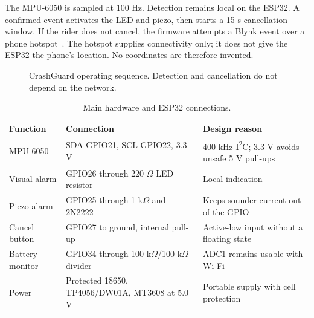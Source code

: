 \documentclass[12pt,a4paper]{article}
\begin{document}
The MPU-6050 is sampled at 100 Hz. Detection remains local on the ESP32. A
confirmed event activates the LED and piezo, then starts a 15 s cancellation
window. If the rider does not cancel, the firmware attempts a Blynk event over
a phone hotspot~\cite{blynkevents}. The hotspot supplies connectivity only;
it does not give the ESP32 the phone's location. No coordinates are therefore
invented.

\begin{figure}[H]
\centering
{}
\caption{CrashGuard operating sequence. Detection and cancellation do not
depend on the network.}
\label{fig:architecture}
\end{figure}

\begin{table}[H]
\centering
\small
\caption{Main hardware and ESP32 connections.}
\begin{tabularx}{\textwidth}{@{}p{}p{}X@{}}
\toprule
Function & Connection & Design reason \\
\midrule
MPU-6050 & SDA GPIO21, SCL GPIO22, 3.3 V & 400 kHz I\textsuperscript{2}C;
3.3 V avoids unsafe 5 V pull-ups \\
Visual alarm & GPIO26 through 220 $\Omega$ LED resistor & Local indication \\
Piezo alarm & GPIO25 through 1 k$\Omega$ and 2N2222 & Keeps sounder current
out of the GPIO \\
Cancel button & GPIO27 to ground, internal pull-up & Active-low input without
a floating state \\
Battery monitor & GPIO34 through 100 k$\Omega$/100 k$\Omega$ divider & ADC1
remains usable with Wi-Fi \\
Power & Protected 18650, TP4056/DW01A, MT3608 at 5.0 V & Portable supply with
cell protection \\
\bottomrule
\end{tabularx}
\end{table}
\end{document}
